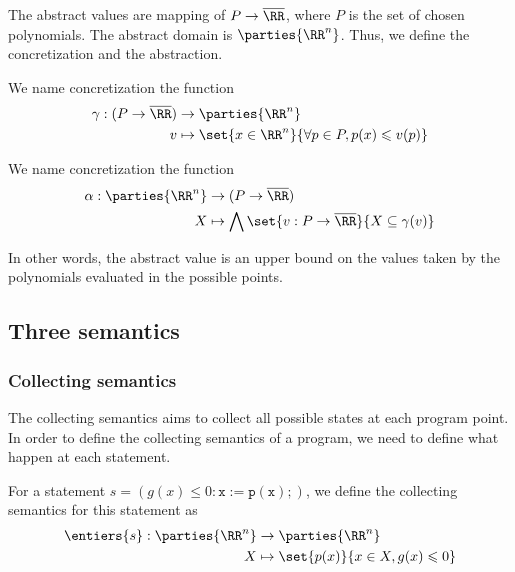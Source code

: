 \documentclass[a4paper, twoside, 10pt]{article}
\begin{document}
The abstract values are mapping of $P \to \overline{\RR}$, where $P$ is the set of chosen polynomials. The abstract domain is $\parties{\RR^n}$. Thus, we define the concretization and the abstraction.
\begin{notation}[Concretization]
    We name concretization the function
    \[
        \begin{aligned}
            \gamma:(P\to\overline{\RR}) &\to \parties{\RR^n}\\
            v &\mapsto \set{x\in\RR^n}{\forall p\in P, p(x) \leqslant v(p)}
        \end{aligned}
    \]
\end{notation}
\begin{notation}[abstraction]
    We name concretization the function
    \[
        \begin{aligned}
            \alpha:\parties{\RR^n} &\to (P\to\overline{\RR})\\
            X &\mapsto \bigwedge \set{v:P\to\overline{\RR}}{X\subseteq \gamma(v)}
        \end{aligned}
    \]
\end{notation}

In other words, the abstract value is an upper bound on the values taken by the polynomials evaluated in the possible points.

\subsection{Three semantics}


\subsubsection{Collecting semantics}

The collecting semantics aims to collect all possible states at each program point. In order to define the collecting semantics of a program, we need to define what happen at each statement.

\begin{definition}
    For a statement $s = (g(x) \leqslant 0: \mathtt{x := p(x);})$, we define the collecting semantics for this statement as
    \[
        \begin{aligned}
            \entiers{s}:\parties{\RR^n} &\to \parties{\RR^n}\\
            X &\mapsto \set{p(x)}{x \in X, g(x) \leqslant 0}
        \end{aligned}
    \]
\end{definition}
\end{document}
